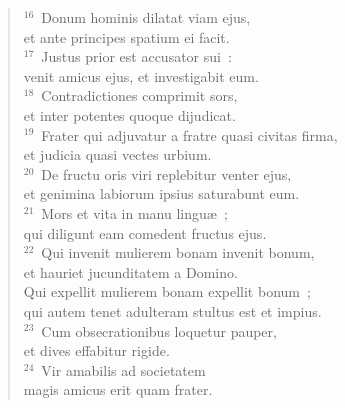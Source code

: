 \begin{flushleft}\begin{verse}${}^{16}$~Donum hominis dilatat viam ejus,\\ et ante principes spatium ei facit.\\
${}^{17}$~Justus prior est accusator sui~:\\ venit amicus ejus, et investigabit eum.\\
${}^{18}$~Contradictiones comprimit sors,\\ et inter potentes quoque dijudicat.\\
${}^{19}$~Frater qui adjuvatur a fratre quasi civitas firma,\\ et judicia quasi vectes urbium.\\
${}^{20}$~De fructu oris viri replebitur venter ejus,\\ et genimina labiorum ipsius saturabunt eum.\\
${}^{21}$~Mors et vita in manu lingu\ae~;\\ qui diligunt eam comedent fructus ejus.\\
${}^{22}$~Qui invenit mulierem bonam invenit bonum,\\ et hauriet jucunditatem a Domino.\\ Qui expellit mulierem bonam expellit bonum~;\\ qui autem tenet adulteram stultus est et impius.\\
${}^{23}$~Cum obsecrationibus loquetur pauper,\\ et dives effabitur rigide.\\
${}^{24}$~Vir amabilis ad societatem\\ magis amicus erit quam frater.\end{verse}\end{flushleft}



